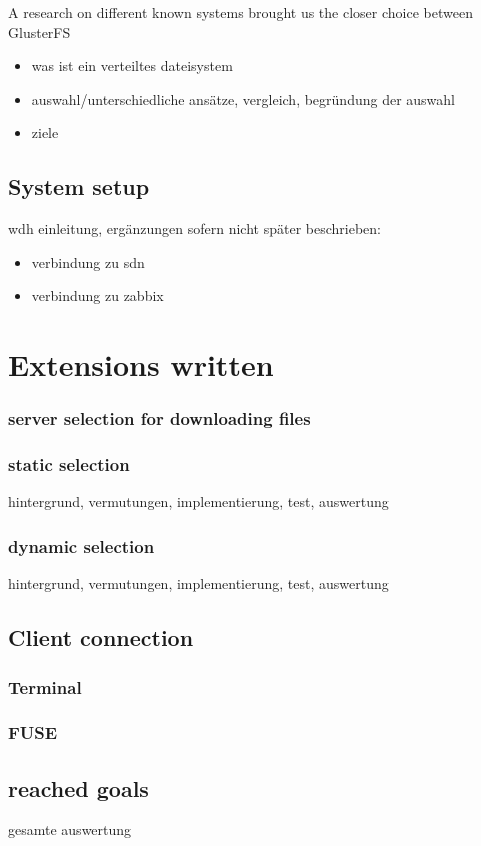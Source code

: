 A research on different known systems brought us the closer choice between GlusterFS 



\begin{itemize}
\item was ist ein verteiltes dateisystem
\item auswahl/unterschiedliche ansätze, vergleich, begründung der auswahl
\item ziele
\end{itemize}

\subsection{System setup}

wdh einleitung, ergänzungen sofern nicht später beschrieben:

\begin{itemize}
\item verbindung zu sdn
\item verbindung zu zabbix
\end{itemize}

\section{Extensions written}

\subsubsection{server selection for downloading files}

\subsubsection{static selection}

hintergrund, vermutungen, implementierung, test, auswertung

\subsubsection{dynamic selection}

hintergrund, vermutungen, implementierung, test, auswertung

\subsection{Client connection}
\subsubsection{Terminal}
\subsubsection{FUSE}

\subsection{reached goals}
gesamte auswertung





